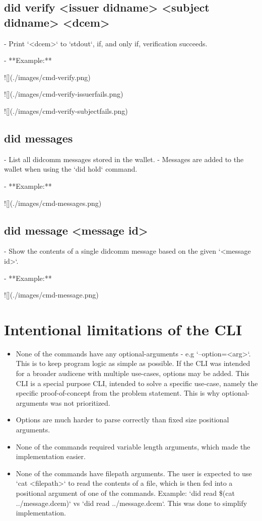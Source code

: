 \subsection{did verify <issuer didname> <subject didname> <dcem>}

- Print `<dcem>` to `stdout`, if, and only if, verification succeeds.

- **Example:**

    ![](./images/cmd-verify.png)

    ![](./images/cmd-verify-issuerfails.png)

    ![](./images/cmd-verify-subjectfails.png)

\subsection{did messages}

- List all didcomm messages stored in the wallet.
- Messages are added to the wallet when using the `did hold` command.

- **Example:**

    ![](./images/cmd-messages.png)

\subsection{did message <message id>}

- Show the contents of a single didcomm message based on the given `<message id>`.

- **Example:**

    ![](./images/cmd-message.png)


\section{Intentional limitations of the CLI}

\begin{itemize}
\item None of the commands have any optional-arguments - e.g `--option=<arg>`. This is to keep program logic as simple as possible. If the CLI was intended for a broader audicene with multiple use-cases, options may be added. This CLI is a special purpose CLI, intended to solve a specific use-case, namely the specific proof-of-concept from the problem statement. This is why optional-arguments was not prioritized.
\item Options are much harder to parse correctly than fixed size positional arguments.
\item None of the commands required variable length arguments, which made the implementation easier.
\item None of the commands have filepath arguments. The user is expected to use `cat <filepath>` to read the contents of a file, which is then fed into a positional argument of one of the commands. Example: `did read \$(cat ../message.dcem)` vs `did read ../message.dcem`. This was done to simplify implementation.
\end{itemize}